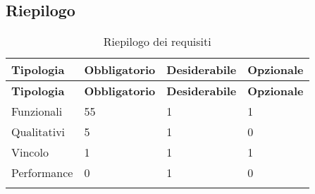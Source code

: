 \documentclass[../AnalisiDeiRequisiti.tex]{subfiles}
\begin{document}
	\subsection{Riepilogo}
	\def\arraystretch{1.5}
		\begin{longtable}{p{2.5cm}!{\VRule[1pt]}p{2.5cm}!{\VRule[1pt]}p{2.5cm}!{\VRule[1pt]}p{2.5cm}}
		\color{white} \textbf{Tipologia} & \color{white} \textbf{Obbligatorio} & \color{white} \textbf{Desiderabile} & \color{white} \textbf{Opzionale} \\ 
		\endfirsthead 
		\color{white} \textbf{Tipologia} & \color{white} \textbf{Obbligatorio} & \color{white} \textbf{Desiderabile} & \color{white} \textbf{Opzionale} \\ 
		\endhead 
		Funzionali & 55 & 1 & 1\\Qualitativi & 5 & 1 & 0\\Vincolo & 1 & 1 & 1\\Performance & 0 & 1 & 0\\
		\caption{Riepilogo dei requisiti}
	\end{longtable}
\end{document}
